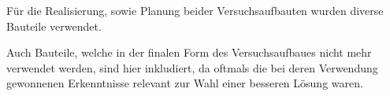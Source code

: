 Für die Realisierung, sowie Planung beider Versuchsaufbauten wurden diverse Bauteile verwendet.

Auch Bauteile, welche in der finalen Form des Versuchsaufbaues nicht mehr verwendet werden, sind hier inkludiert, da oftmals die bei deren Verwendung gewonnenen Erkenntnisse relevant zur Wahl einer besseren Lösung waren.
